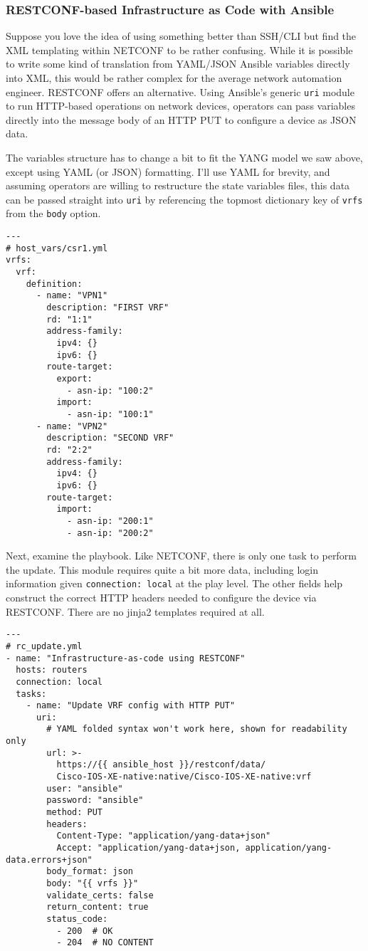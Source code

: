 \subsubsection{RESTCONF-based Infrastructure as Code with Ansible}
Suppose you love the idea of using something better than SSH/CLI but
find the XML templating within NETCONF to be rather confusing. While it is
possible to write some kind of translation from YAML/JSON Ansible variables
directly into XML, this would be rather complex for the average network
automation engineer. RESTCONF offers an alternative. Using Ansible's
generic \verb|uri| module to run HTTP-based operations on network devices,
operators can pass variables directly into the message body of an HTTP PUT
to configure a device as JSON data.

The variables structure has to change a bit to fit the YANG model we saw
above, except using YAML (or JSON) formatting. I'll use YAML for brevity,
and assuming operators are willing to restructure the state variables files,
this data can be passed straight into \verb|uri| by referencing the topmost
dictionary key of \verb|vrfs| from the \verb|body| option.

\begin{verbatim}
---
# host_vars/csr1.yml
vrfs:
  vrf:
    definition:
      - name: "VPN1"
        description: "FIRST VRF"
        rd: "1:1"
        address-family:
          ipv4: {}
          ipv6: {}
        route-target:
          export:
            - asn-ip: "100:2"
          import:
            - asn-ip: "100:1"
      - name: "VPN2"
        description: "SECOND VRF"
        rd: "2:2"
        address-family:
          ipv4: {}
          ipv6: {}
        route-target:
          import:
            - asn-ip: "200:1"
            - asn-ip: "200:2"
\end{verbatim}

Next, examine the playbook. Like NETCONF, there is only one task to perform
the update. This module requires quite a bit more data, including login
information given \verb|connection: local| at the play level. The other
fields help construct the correct HTTP headers needed to configure the
device via RESTCONF\@. There are no jinja2 templates required at all.

\begin{verbatim}
---
# rc_update.yml
- name: "Infrastructure-as-code using RESTCONF"
  hosts: routers
  connection: local
  tasks:
    - name: "Update VRF config with HTTP PUT"
      uri:
        # YAML folded syntax won't work here, shown for readability only
        url: >-
          https://{{ ansible_host }}/restconf/data/
          Cisco-IOS-XE-native:native/Cisco-IOS-XE-native:vrf
        user: "ansible"
        password: "ansible"
        method: PUT
        headers:
          Content-Type: "application/yang-data+json"
          Accept: "application/yang-data+json, application/yang-data.errors+json"
        body_format: json
        body: "{{ vrfs }}"
        validate_certs: false
        return_content: true
        status_code:
          - 200  # OK
          - 204  # NO CONTENT
\end{verbatim}

